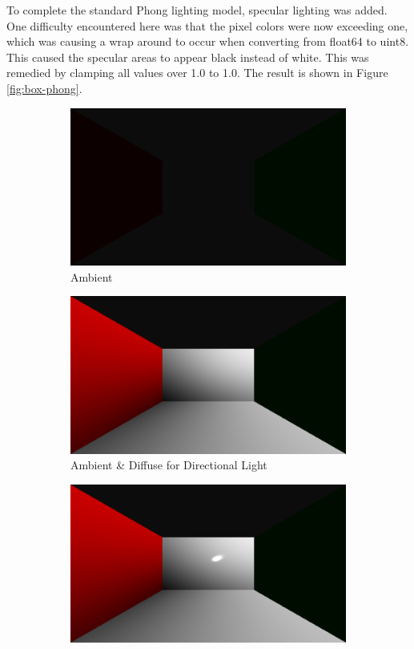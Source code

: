 \documentclass[letterpaper, 11pt, onecolumn, oneside]{article}
\begin{document}
    To complete the standard Phong lighting model, specular lighting was added.
    One difficulty encountered here was that the pixel colors were now exceeding one, which was causing a wrap around to occur when converting from float64 to uint8.
    This caused the specular areas to appear black instead of white.
    This was remedied by clamping all values over 1.0 to 1.0.
    The result is shown in Figure \ref{fig:box-phong}.

    \begin{figure}
    \centering
    \begin{subfigure}{.3\textwidth}
      \centering
      \includegraphics[width=.85\linewidth]{box-16xAA-ambient.png}
      \caption{Ambient}
      \label{fig:box-ambient}
    \end{subfigure}%
    \begin{subfigure}{.3\textwidth}
      \centering
      \includegraphics[width=.85\linewidth]{box-16xAA-directional-ambient-diffuse.png}
      \caption{Ambient \& Diffuse for Directional Light}
      \label{fig:box-ambient-diffuse}
    \end{subfigure}%
    \begin{subfigure}{.3\textwidth}
      \centering
      \includegraphics[width=.85\linewidth]{box-16xAA-directional-phong.png}

\end{subfigure}
\end{figure}
\end{document}
